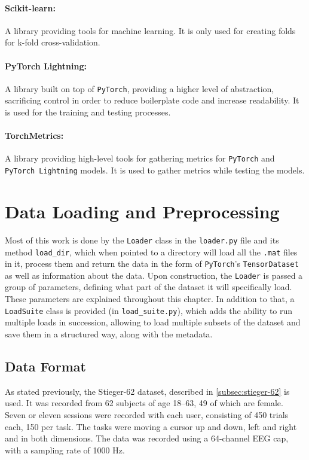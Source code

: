 \documentclass[english, he, bc, kiv, iso690alph]{fasthesis}
\begin{document}
\paragraph{Scikit-learn:} A library providing tools for machine learning. It is only used for creating folds for k-fold cross-validation.

\paragraph{PyTorch Lightning:} A library built on top of \texttt{PyTorch}, providing a higher level of abstraction, sacrificing control in order to reduce boilerplate code and increase readability. It is used for the training and testing processes.

\paragraph{TorchMetrics:} A library providing high-level tools for gathering metrics for \texttt{PyTorch} and \texttt{PyTorch Lightning} models. It is used to gather metrics while testing the models.

\section{Data Loading and Preprocessing}

Most of this work is done by the \texttt{Loader} class in the \texttt{loader.py} file and its method \texttt{load\_dir}, which when pointed to a directory will load all the \texttt{.mat} files in it, process them and return the data in the form of \texttt{PyTorch}'s \texttt{TensorDataset} as well as information about the data. Upon construction, the \texttt{Loader} is passed a group of parameters, defining what part of the dataset it will specifically load. These parameters are explained throughout this chapter. In addition to that, a \texttt{LoadSuite} class is provided (in \texttt{load\_suite.py}), which adds the ability to run multiple loads in succession, allowing to load multiple subsets of the dataset and save them in a structured way, along with the metadata.

\subsection{Data Format}

As stated previously, the Stieger-62 dataset, described in \ref{subsec:stieger-62} is used. It was recorded from 62 subjects of age 18--63, 49 of which are female. Seven or eleven sessions were recorded with each user, consisting of 450 trials each, 150 per task. The tasks were moving a cursor up and down, left and right and in both dimensions. The data was recorded using a 64-channel EEG cap, with a sampling rate of 1000 Hz.
\end{document}
